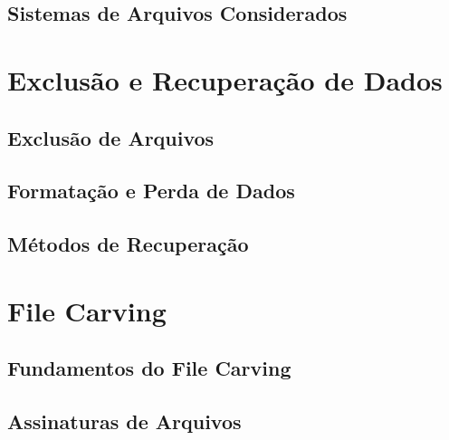 \documentclass[cic,diss,portuguese]{infufrgs}
\begin{document}
\subsection{Sistemas de Arquivos Considerados}

\section{Exclusão e Recuperação de Dados}

\subsection{Exclusão de Arquivos}

\subsection{Formatação e Perda de Dados}

\subsection{Métodos de Recuperação}

\section{File Carving}

\subsection{Fundamentos do File Carving}

\subsection{Assinaturas de Arquivos}
\end{document}
